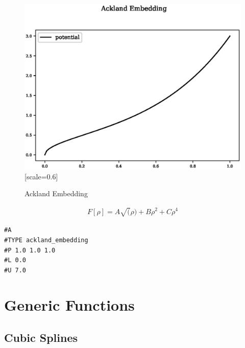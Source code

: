 \documentclass[12pt,twoside]{manual}
\begin{document}
\begin{appendices}
\begin{figure}[h]
  \begin{center}
    \includegraphics{img/plots/ackland_embedding.eps}[scale=0.6]
    \caption{Ackland Embedding}
    \label{graph:graph1}
  \end{center}
\end{figure}

\begin{equation}
\begin{split}
F[\rho] = A \sqrt(\rho) + B \rho^2 + C \rho^4
\end{split}
\label{eq:acklandEmbedding}
\end{equation}

\begin{lstlisting}[style=pseudocode,caption={Ackland Embedding}]
#A
#TYPE ackland_embedding
#P 1.0 1.0 1.0
#L 0.0
#U 7.0
\end{lstlisting}











\section{Generic Functions}


\subsection{Cubic Splines}


\end{appendices}
\end{document}
